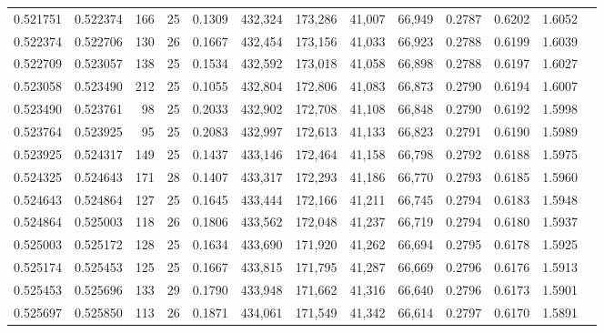 \begin{tabular}{rrrrrrrrrrrrr}
0.521751 & 0.522374 &   166 &  25 &                                     0.1309 & 432,324 & 173,286 &  41,007 &  66,949 & 0.2787 & 0.6202 & 1.6052 \\
0.522374 & 0.522706 &   130 &  26 &                                     0.1667 & 432,454 & 173,156 &  41,033 &  66,923 & 0.2788 & 0.6199 & 1.6039 \\
0.522709 & 0.523057 &   138 &  25 &                                     0.1534 & 432,592 & 173,018 &  41,058 &  66,898 & 0.2788 & 0.6197 & 1.6027 \\
0.523058 & 0.523490 &   212 &  25 &                                     0.1055 & 432,804 & 172,806 &  41,083 &  66,873 & 0.2790 & 0.6194 & 1.6007 \\
0.523490 & 0.523761 &    98 &  25 &                                     0.2033 & 432,902 & 172,708 &  41,108 &  66,848 & 0.2790 & 0.6192 & 1.5998 \\
0.523764 & 0.523925 &    95 &  25 &                                     0.2083 & 432,997 & 172,613 &  41,133 &  66,823 & 0.2791 & 0.6190 & 1.5989 \\
0.523925 & 0.524317 &   149 &  25 &                                     0.1437 & 433,146 & 172,464 &  41,158 &  66,798 & 0.2792 & 0.6188 & 1.5975 \\
0.524325 & 0.524643 &   171 &  28 &                                     0.1407 & 433,317 & 172,293 &  41,186 &  66,770 & 0.2793 & 0.6185 & 1.5960 \\
0.524643 & 0.524864 &   127 &  25 &                                     0.1645 & 433,444 & 172,166 &  41,211 &  66,745 & 0.2794 & 0.6183 & 1.5948 \\
0.524864 & 0.525003 &   118 &  26 &                                     0.1806 & 433,562 & 172,048 &  41,237 &  66,719 & 0.2794 & 0.6180 & 1.5937 \\
0.525003 & 0.525172 &   128 &  25 &                                     0.1634 & 433,690 & 171,920 &  41,262 &  66,694 & 0.2795 & 0.6178 & 1.5925 \\
0.525174 & 0.525453 &   125 &  25 &                                     0.1667 & 433,815 & 171,795 &  41,287 &  66,669 & 0.2796 & 0.6176 & 1.5913 \\
0.525453 & 0.525696 &   133 &  29 &                                     0.1790 & 433,948 & 171,662 &  41,316 &  66,640 & 0.2796 & 0.6173 & 1.5901 \\
0.525697 & 0.525850 &   113 &  26 &                                     0.1871 & 434,061 & 171,549 &  41,342 &  66,614 & 0.2797 & 0.6170 & 1.5891 \\

\end{tabular}
